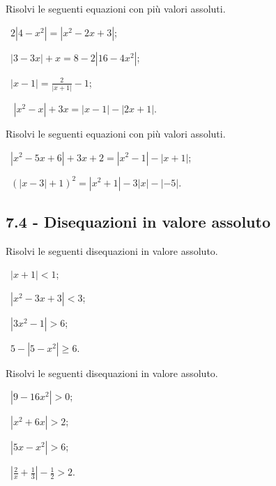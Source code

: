 \begin{esercizio}[\Ast]
 \label{ese:7.28}
Risolvi le seguenti equazioni con più valori assoluti.
\begin{multicols}{2}
 \begin{enumeratea}
 \item~$2\left|4-x^2\right|=\left|x^2-2x+3\right|$;
 \item~$\left|3-3x\right|+x=8-2\left|16-4x^2\right|$;
 \item~$\left|x-1\right|=\frac 2 {\left|x+1\right|}-1$;
 \item~ $\left|x^2-x\right|+3x=\left|x-1\right|-\left|2x+1\right|$.
 \end{enumeratea}
 \end{multicols}
\end{esercizio}

\begin{esercizio}[\Ast]
 \label{ese:7.29}
Risolvi le seguenti equazioni con più valori assoluti.
 \begin{enumeratea}
\item~$\left|x^2-5x+6\right|+3x+2=\left|x^2-1\right|-\left|x+1\right|$;
\item~$\left(\left|x-3\right|+1\right)^2=\left|x^2+1\right|-3\left|x\right|-\left|-5\right|$.
 \end{enumeratea}
\end{esercizio}

\subsection*{7.4 - Disequazioni in valore assoluto}

\begin{esercizio}[\Ast]
 \label{ese:7.30}
Risolvi le seguenti disequazioni in valore assoluto.
\begin{multicols}{2}
 \begin{enumeratea}
 \item~$\left|x+1\right|<1$;
 \item~$\left|x^2-3x+3\right|<3$;
 \item~$\left|3x^2-1\right|>6$;
 \item~$5-\left|5-x^2\right|\ge 6$.
 \end{enumeratea}
 \end{multicols}
\end{esercizio}

\begin{esercizio}[\Ast]
 \label{ese:7.31}
Risolvi le seguenti disequazioni in valore assoluto.
\begin{multicols}{2}
 \begin{enumeratea}
 \item~$\left|9-16x^2\right|>0$;
 \item~$\left|x^2+6x\right|>2$;
 \item~$\left|5x-x^2\right|>6$;
 \item~$\left|\frac 2 x+\frac 1 3\right|-\frac 1 2>2$.
 \end{enumeratea}
 \end{multicols}
\end{esercizio}

